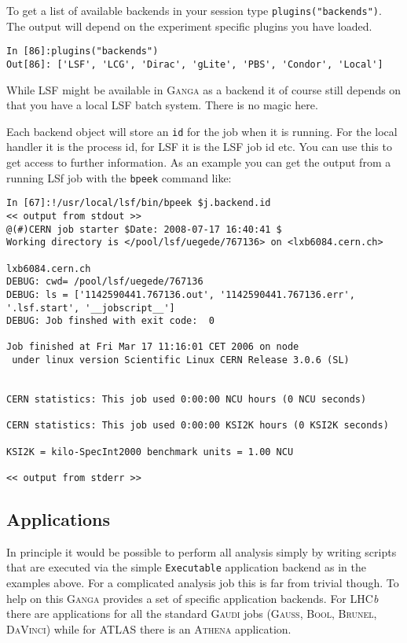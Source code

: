 \documentclass{howto}
\def\ganga {\textsc{Ganga}\xspace}
\def\lhcb {LHC{\em b\/}\xspace}
\begin{document}
To get a list of available backends in your session type \texttt{plugins("backends")}.
The output will depend on the experiment specific plugins you have loaded.
\begin{verbatim}
In [86]:plugins("backends")
Out[86]: ['LSF', 'LCG', 'Dirac', 'gLite', 'PBS', 'Condor', 'Local']
\end{verbatim}
While LSF might be available in \ganga as a backend it of course still depends
on that you have a local LSF batch system. There is no magic here.

Each backend object will store an \texttt{id} for the job when it is running.
For the local handler it is the process id, for LSF it is the LSF job id etc.
You can use this to get access to further information. As an example you can
get the output from a running LSf job with the \texttt{bpeek} command like:
\begin{verbatim}
In [67]:!/usr/local/lsf/bin/bpeek $j.backend.id
<< output from stdout >>
@(#)CERN job starter $Date: 2008-07-17 16:40:41 $
Working directory is </pool/lsf/uegede/767136> on <lxb6084.cern.ch>

lxb6084.cern.ch
DEBUG: cwd= /pool/lsf/uegede/767136
DEBUG: ls = ['1142590441.767136.out', '1142590441.767136.err', '.lsf.start', '__jobscript__']
DEBUG: Job finshed with exit code:  0

Job finished at Fri Mar 17 11:16:01 CET 2006 on node 
 under linux version Scientific Linux CERN Release 3.0.6 (SL)


CERN statistics: This job used 0:00:00 NCU hours (0 NCU seconds)

CERN statistics: This job used 0:00:00 KSI2K hours (0 KSI2K seconds)

KSI2K = kilo-SpecInt2000 benchmark units = 1.00 NCU

<< output from stderr >>
\end{verbatim}

\subsection{Applications}
In principle it would be possible to perform all analysis simply by writing
scripts that are executed via the simple \texttt{Executable} application
backend as in the examples above. For a complicated analysis job this is far
from trivial though. To help on this \ganga provides a set of specific
application backends. For \lhcb there are applications for all the standard
\textsc{Gaudi} jobs (\textsc{Gauss}, \textsc{Bool}, \textsc{Brunel},
\textsc{DaVinci}) while for ATLAS there is an \textsc{Athena} application.
\end{document}
